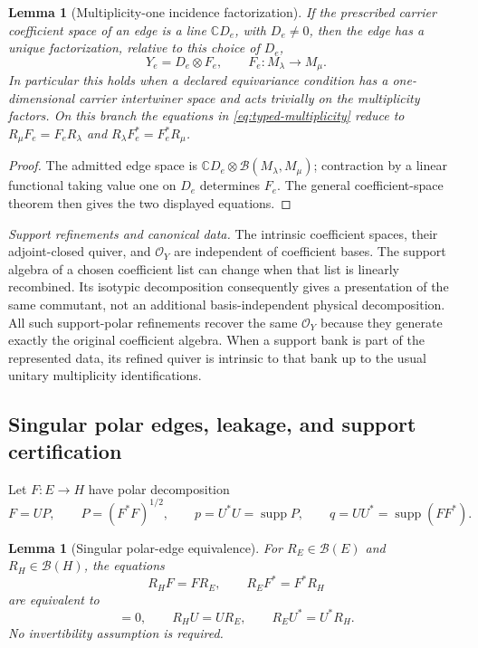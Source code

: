 \documentclass[11pt]{article}
\numberwithin{equation}{section}
\newtheorem{lemma}[theorem]{Lemma}
\theoremstyle{definition}
\theoremstyle{remark}
\newcommand{\C}{\mathbb C}
\newcommand{\supp}{\operatorname{supp}}
\newcommand{\Oalg}{\mathcal O}
\begin{document}
\begin{lemma}[Multiplicity-one incidence factorization]
\label{lem:multiplicity-factorization}
If the prescribed carrier coefficient space of an edge is a line
$\C D_e$, with $D_e\ne0$, then the edge has a unique factorization, relative
to this choice of $D_e$,
\begin{equation}
 Y_e=D_e\otimes F_e,\qquad F_e:M_\lambda\to M_\mu.
 \label{eq:incidence-factorization}
\end{equation}
In particular this holds when a declared equivariance condition has a
one-dimensional carrier intertwiner space and acts trivially on the
multiplicity factors.  On this branch the equations in
\eqref{eq:typed-multiplicity} reduce to
$R_\mu F_e=F_eR_\lambda$ and $R_\lambda F_e^*=F_e^*R_\mu$.
\end{lemma}

\begin{proof}
The admitted edge space is
$\C D_e\otimes\mathcal B(M_\lambda,M_\mu)$; contraction by a linear
functional taking value one on $D_e$ determines $F_e$.  The general
coefficient-space theorem then gives the two displayed equations.
\end{proof}

\noindent\textit{Support refinements and canonical data.} The intrinsic coefficient spaces, their adjoint-closed quiver, and
$\Oalg_Y$ are independent of coefficient bases.  The support algebra of a
chosen coefficient list can change when that list is linearly recombined.
Its isotypic decomposition consequently gives a presentation of the same
commutant, not an additional basis-independent physical decomposition.
All such support-polar refinements recover the same $\Oalg_Y$ because
they generate exactly the original coefficient algebra.  When a support
bank is part of the represented data, its refined quiver is intrinsic to
that bank up to the usual unitary multiplicity identifications.


\subsection{Singular polar edges, leakage, and support certification}
\label{app:polar-details}

Let $F:E\to H$ have polar decomposition
\[
F=UP,
\qquad
P=(F^*F)^{1/2},
\qquad
p=U^*U=\supp P,
\qquad
q=UU^*=\supp(FF^*).
\]

\begin{lemma}[Singular polar-edge equivalence]
\label{lem:polar-edge}
For $R_E\in\mathcal B(E)$ and $R_H\in\mathcal B(H)$, the equations
\[
R_HF=FR_E,
\qquad
R_EF^*=F^*R_H
\]
are equivalent to
\begin{equation}
[R_E,P^2]=0,
\qquad
R_HU=UR_E,
\qquad
R_EU^*=U^*R_H.
\label{eq:polar-edge-equivalence}
\end{equation}
No invertibility assumption is required.
\end{lemma}
\end{document}

